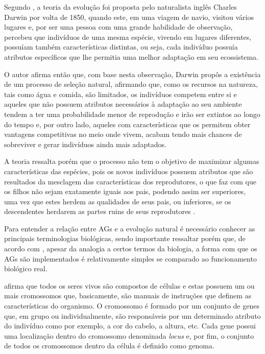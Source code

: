 \par Segundo , a teoria da evolução foi proposta pelo naturalista
inglês Charles Darwin por volta de 1850, quando este, em uma viagem de navio, visitou vários lugares e, 
por ser uma pessoa com uma grande habilidade de observação, percebeu que indivíduos de uma mesma espécie, 
vivendo em lugares diferentes, possuíam também características distintas, ou seja, cada indivíduo  possuía 
atributos específicos que lhe permitia uma melhor adaptação em seu ecossistema. 


\par O autor afirma então que, com base nesta observação, Darwin propôs a existência de um processo de
seleção natural, afirmando que, como os recursos na natureza, tais como água e comida,
são limitados, os indivíduos competem entre si e aqueles que não possuem atributos necessários
à adaptação ao seu ambiente tendem a ter uma probabilidade menor de reprodução e
irão ser extintos ao longo do tempo e, por outro lado, aqueles
com características que os permitem obter vantagens competitivas no meio onde
vivem, acabam tendo mais chances de sobreviver e gerar indivíduos ainda mais
adaptados. 

\par A teoria ressalta porém que o processo não tem o objetivo de maximizar
algumas características das espécies, pois  os novos indivíduos
possuem atributos que são resultados da mesclagem das características dos reprodutores,
o que faz com que os filhos não sejam exatamente iguais aos pais, podendo assim
ser superiores, uma vez que estes herdem as qualidades de seus pais, ou
inferiores, se os descendentes herdarem as partes ruins de seus
reprodutores \cite{livro_ags_ricardo_linden}.

\par Para entender a relação entre AGs e a evolução natural é
necessário conhecer as principais terminologias biológicas, 
sendo importante ressaltar porém que, de acordo com
, apesar da 
analogia a certos termos da biologia, a forma com que os AGs 
são implementados é relativamente simples se comparado ao funcionamento
biológico real.

\par {} afirma que 
todos os seres vivos são compostos de células e estas possuem um ou mais
cromossomos que, basicamente, são manuais de instruções que definem as 
características do organismo. O cromossomo é formado por um conjunto de genes
que, em grupo ou individualmente, são responsáveis por um determinado atributo
do indivíduo como por exemplo, a cor do cabelo, a altura, etc. Cada gene possui
uma localização dentro do cromossomo denominada \textit{locus} e, por fim, o
conjunto de todos os cromossomos dentro da célula é definido como genoma. 

